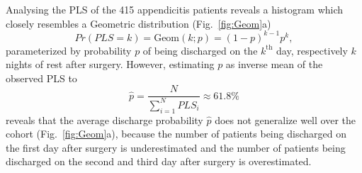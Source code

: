 Analysing the PLS of the 415 appendicitis patients reveals a
histogram which closely resembles a Geometric distribution (Fig.~\ref{fig:Geom}a)
\begin{equation}
Pr(PLS=k) = \text{Geom}(k; p) = (1-p)^{k-1}p^{k},
\end{equation}
parameterized by probability $p$ of being discharged on the $k^\text{th}$ day, respectively $k$ nights of rest after surgery. 
However, estimating $p$ as inverse mean of the observed PLS to 
\begin{equation}
 \hat{p} = \frac{N}{\sum\limits_{i=1}^N PLS_i} \approx 61.8\%	
\end{equation}
reveals that the average discharge probability $\hat{p}$ does not
generalize well over the cohort (Fig.~\ref{fig:Geom}a), because the number of patients being discharged on the first day after surgery is underestimated and the number of patients being discharged on the second and third day after surgery is overestimated.

